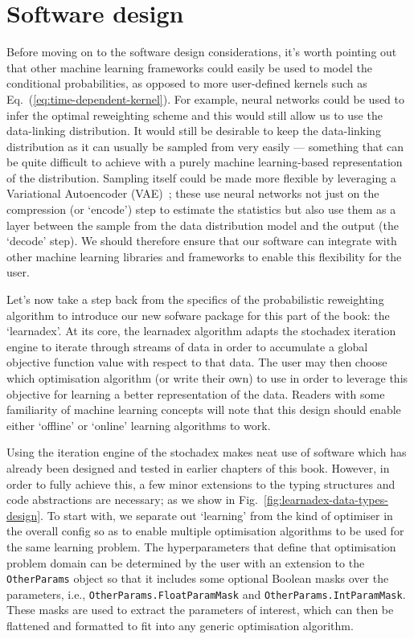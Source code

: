\section{\sffamily Software design}

Before moving on to the software design considerations, it's worth pointing out that other machine learning frameworks could easily be used to model the conditional probabilities, as opposed to more user-defined kernels such as Eq.~(\ref{eq:time-dependent-kernel}). For example, neural networks could be used to infer the optimal reweighting scheme and this would still allow us to use the data-linking distribution. It would still be desirable to keep the data-linking distribution as it can usually be sampled from very easily --- something that can be quite difficult to achieve with a purely machine learning-based representation of the distribution. Sampling itself could be made more flexible by leveraging a Variational Autoencoder (VAE)~\cite{pinheiro2021variational}; these use neural networks not just on the compression (or `encode') step to estimate the statistics but also use them as a layer between the sample from the data distribution model and the output (the `decode' step). We should therefore ensure that our software can integrate with other machine learning libraries and frameworks to enable this flexibility for the user.

Let's now take a step back from the specifics of the probabilistic reweighting algorithm to introduce our new sofware package for this part of the book: the `learnadex'. At its core, the learnadex algorithm adapts the stochadex iteration engine to iterate through streams of data in order to accumulate a global objective function value with respect to that data. The user may then choose which optimisation algorithm (or write their own) to use in order to leverage this objective for learning a better representation of the data. Readers with some familiarity of machine learning concepts will note that this design should enable either `offline' or `online' learning algorithms to work.

Using the iteration engine of the stochadex makes neat use of software which has already been designed and tested in earlier chapters of this book. However, in order to fully achieve this, a few minor extensions to the typing structures and code abstractions are necessary; as we show in Fig.~\ref{fig:learnadex-data-types-design}. To start with, we separate out `learning' from the kind of optimiser in the overall config so as to enable multiple optimisation algorithms to be used for the same learning problem. The hyperparameters that define that optimisation problem domain can be determined by the user with an extension to the \texttt{OtherParams} object so that it includes some optional Boolean masks over the parameters, i.e., \texttt{OtherParams.FloatParamMask} and \texttt{OtherParams.IntParamMask}. These masks are used to extract the parameters of interest, which can then be flattened and formatted to fit into any generic optimisation algorithm.

